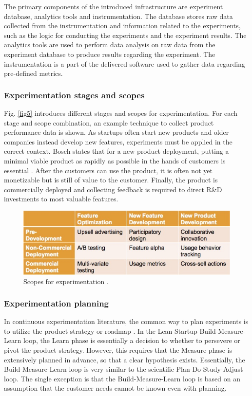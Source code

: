 \documentclass[english]{tktltiki2}
\theoremstyle{definition}
\theoremstyle{remark}
\begin{document}
The primary components of the introduced infrastructure are experiment database, analytics tools and instrumentation. The database stores raw data collected from the instrumentation and information related to the experiments, such as the logic for conducting the experiments and the experiment results. The analytics tools are used to perform data analysis on raw data from the experiment database to produce results regarding the experiment. The instrumentation is a part of the delivered software used to gather data regarding pre-defined metrics.  

\subsubsection{Experimentation stages and scopes}
Fig. \ref{fig5} introduces different stages and scopes for experimentation. For each stage and scope combination, an example technique to collect product performance data is shown. As startups often start new products and older companies instead develop new features, experiments must be applied in the correct context. Bosch states that for a new product deployment, putting a minimal viable product as rapidly as possible in the hands of customers is essential \cite{bosch2012building}. After the customers can use the product, it is often not yet monetizable but is still of value to the customer. Finally, the product is commercially deployed and collecting feedback is required to direct R\&D investments to most valuable features.
\begin{figure}[h]
	\centering
	\includegraphics[width=5.0in]{scopes.jpg}
	\caption{Scopes for experimentation \cite{bosch2012building}.}
	\label{fig6}
\end{figure}

\subsubsection{Experimentation planning}
In continuous experimentation literature, the common way to plan experiments is to utilize the product strategy or roadmap \cite{ries2011lean, fagerholm2012building}. In the Lean Startup Build-Measure-Learn loop, the Learn phase is essentially a decision to whether to persevere or pivot the product strategy. However, this requires that the Measure phase is extensively planned in advance, so that a clear hypothesis exists. Essentially, the Build-Measure-Learn loop is very similar to the scientific Plan-Do-Study-Adjust loop. The single exception is that the Build-Measure-Learn loop is based on an assumption that the customer needs cannot be known even with planning. 
\end{document}
